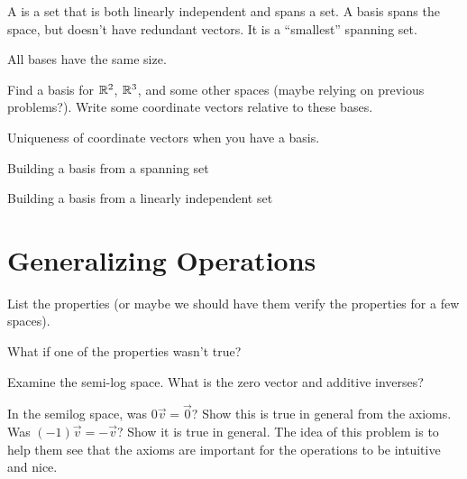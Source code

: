 \begin{definition}
  A  is a set that is both linearly independent
  and spans a set.  A basis spans the space, but doesn't have
  redundant vectors.  It is a ``smallest'' spanning set.
\end{definition}

\begin{problemtodo}
  All bases have the same size.
\end{problemtodo}

\begin{problemtodo}
  Find a basis for $\mathbb{R}^2$, $\mathbb{R}^3$, and some other spaces (maybe
  relying on previous problems?).  Write some coordinate vectors
  relative to these bases.
\end{problemtodo}

\begin{problemtodo}
  Uniqueness of coordinate vectors when you have a basis.
\end{problemtodo}

\begin{problemtodo}
  Building a basis from a spanning set
\end{problemtodo}

\begin{problemtodo}
  Building a basis from a linearly independent set
\end{problemtodo}

\section{Generalizing Operations}

List the properties (or maybe we should have them verify the
properties for a few spaces).

\begin{problemtodo}
  What if one of the properties wasn't true?
\end{problemtodo}

\begin{problemtodo}
  Examine the semi-log space.  What is the zero vector and additive inverses?
\end{problemtodo}

\begin{problemtodo}
  In the semilog space, was $0\vec v=\vec 0$?  Show this is true in
  general from the axioms.  Was $(-1)\vec v=-\vec v$?  Show it is true
  in general.  The idea of this problem is to help them see that the
  axioms are important for the operations to be intuitive and nice.
\end{problemtodo}


